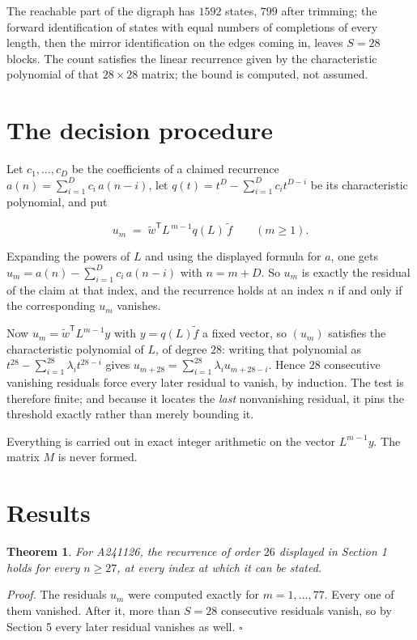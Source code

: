 \documentclass[11pt]{article}
\newtheorem{theorem}{Theorem}
\theoremstyle{definition}
\begin{document}
The reachable part of the digraph has $1592$ states, $799$ after trimming; the forward identification of states with equal numbers of completions of every length, then the mirror identification on the edges coming in, leaves $S = 28$ blocks. The count satisfies the linear recurrence given by the characteristic polynomial of that $28\times28$ matrix; the bound is computed, not assumed.

\section{The decision procedure}

Let $c_1,\dots,c_D$ be the coefficients of a claimed recurrence $a(n) = \sum_{i=1}^{D} c_i\,a(n-i)$, let $q(t) = t^{D} - \sum_{i=1}^{D} c_i t^{D-i}$ be its characteristic polynomial, and put

\[u_m \;=\; \tilde w^{\mathsf T} L^{\,m-1} q(L)\,\tilde f \qquad (m \ge 1).\]

Expanding the powers of $L$ and using the displayed formula for $a$, one gets $u_m = a(n) - \sum_{i=1}^{D} c_i\,a(n-i)$ with $n = m + D$. So $u_m$ is exactly the residual of the claim at that index, and the recurrence holds at an index $n$ if and only if the corresponding $u_m$ vanishes.

Now $u_m = \tilde w^{\mathsf T} L^{m-1} y$ with $y = q(L)\tilde f$ a fixed vector, so $(u_m)$ satisfies the characteristic polynomial of $L$, of degree $28$: writing that polynomial as $t^{28} - \sum_{i=1}^{28} \lambda_i t^{28-i}$ gives $u_{m+28} = \sum_{i=1}^{28} \lambda_i u_{m+28-i}$. Hence $28$ consecutive vanishing residuals force every later residual to vanish, by induction. The test is therefore finite; and because it locates the {\itshape last} nonvanishing residual, it pins the threshold exactly rather than merely bounding it.

Everything is carried out in exact integer arithmetic on the vector $L^{m-1}y$. The matrix $M$ is never formed.

\section{Results}

\begin{theorem} For A241126, the recurrence of order $26$ displayed in Section 1 holds for every $n \ge 27$, at every index at which it can be stated.\end{theorem}

{\itshape Proof.} The residuals $u_m$ were computed exactly for $m = 1,\dots,77$. Every one of them vanished. After it, more than $S = 28$ consecutive residuals vanish, so by Section 5 every later residual vanishes as well. $\square$
\end{document}
